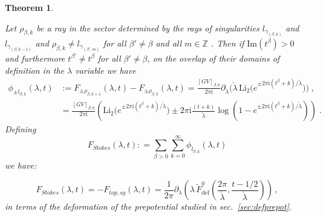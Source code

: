 \documentclass[a4paper,12pt,justification=centering]{article}
\numberwithin{equation}{section}
\newcommand{\I}{{\mathrm i}}
\theoremstyle{plain}%
\newtheorem{thm}{Theorem}[section]
\theoremstyle{definition}
\begin{document}
\begin{thm} \label{thm:Stokes}

Let $\rho_{\beta,k}$ be a ray in the sector determined by the rays of singularities $l_{\gamma_{(\beta,k)}}$ and $l_{\gamma_{(\beta,k-1)}}$ and $\rho_{\beta,k} \ne l_{\gamma_{(\beta',m)}}$ for all $\beta' \ne \beta$ and all $m \in \mathbb{Z}$ . Then if $\mathrm{Im}(t^{\beta})>0$ and furthermore $t^{\beta'} \ne t^{\beta}$ for all $\beta'\ne \beta$, on the overlap of their domains of definition in the $\lambda$ variable we have
\begin{align}\label{eq:Stokesjumpsgeneral}
    \phi_{\pm l_{\beta,k}}(\lambda,t)&:=F_{\pm \rho_{\beta,k+1}}(\lambda,t)
    -F_{\pm \rho_{\beta,k}}(\lambda,t) =\frac{[GV]_{\beta,0}}{2\pi \I}\partial_{\check\lambda}\Big(\check{\lambda}\,\mathrm{Li}_2\big(e^{\pm 2\pi \I(t^{\beta}+k)/\check \lambda}\big)\Big)\;, \, \\
    &= \frac{[GV]_{\beta,0}}{2\pi \I} \left( \mathrm{Li}_2\big(e^{\pm 2\pi \I(t^{\beta}+k)/\check \lambda}\big) \pm 2\pi \I \frac{(t+k)}{\check \lambda} \log \left(1- e^{\pm 2\pi \I(t^{\beta}+k)/\check \lambda} \right)\right)\;.
\end{align}
Defining
\begin{equation}
 F_{Stokes}(\lambda,t): =  \sum_{\beta>0} \sum_{k=0}^{\infty} \phi_{ l_{\beta,k}}(\lambda,t)
 \end{equation}
 we have:
 
 \begin{equation}
 F_{Stokes}(\lambda,t) = - F_{top,sg}(\lambda,t)=  \frac{1}{2\pi} \partial_{\lambda} \left( \lambda \, \tilde{F}^{0}_{\textrm{def}} \left( \frac{2\pi}{\check{\lambda}}, \frac{t-1/2}{\check{\lambda}} \right)\right)\,,
 \end{equation}
 in terms of the deformation of the prepotential studied in sec.~\ref{sec:defprepot}.
 
\end{thm}
\end{document}
